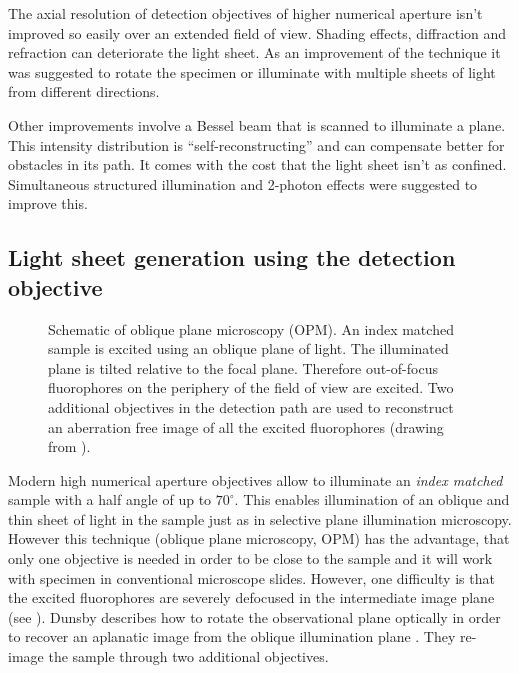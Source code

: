 
The axial resolution of detection objectives of higher numerical
aperture isn't improved so easily over an extended field of
view. Shading effects, diffraction and refraction can deteriorate the
light sheet. As an improvement of the technique it was suggested to
rotate the specimen or illuminate with multiple sheets of light from
different directions.

Other improvements involve a Bessel beam that is scanned to illuminate
a plane. This intensity distribution is ``self-reconstructing'' and
can compensate better for obstacles in its path. It comes with the
cost that the light sheet isn't as confined. Simultaneous structured
illumination and 2-photon effects were suggested to improve this.


\subsection{Light sheet generation using the detection objective}
\label{sec:hilo}
\begin{figure}[!hbt]
  \centering
  \caption{Schematic of oblique plane microscopy (OPM). An index
    matched sample is excited using an oblique plane of light. The
    illuminated plane is tilted relative to the focal plane. Therefore
    out-of-focus fluorophores on the periphery of the field of view
    are excited. Two additional objectives in the detection path are
    used to reconstruct an aberration free image of all the excited
    fluorophores (drawing from \cite{Dunsby2008}).}
  \label{fig:dunsby}
\end{figure}
Modern high numerical aperture objectives allow to illuminate an
\emph{index matched} sample with a half angle of up to
$70^\circ$. This enables illumination of an oblique and thin sheet of
light in the sample just as in selective plane illumination
microscopy. However this technique (oblique plane microscopy, OPM) has
the advantage, that only one objective is needed in order to be close
to the sample and it will work with specimen in conventional
microscope slides. However, one difficulty is that the excited
fluorophores are severely defocused in the intermediate image plane
(see ). Dunsby describes how to rotate the
observational plane optically in order to recover an aplanatic image
from the oblique illumination plane \citep{Dunsby2008}. They re-image
the sample through two additional objectives.

